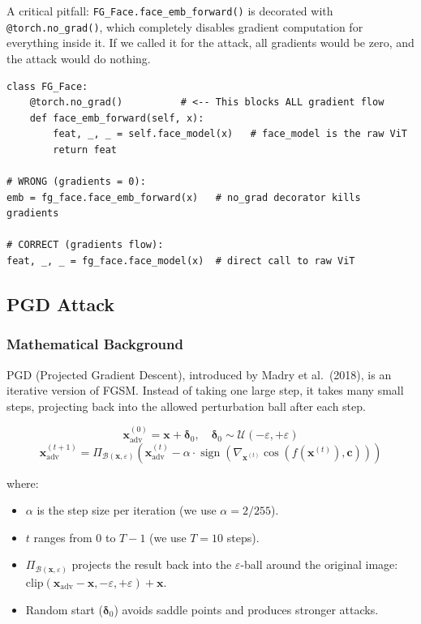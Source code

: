 \documentclass[12pt,a4paper]{article}
\newcommand{\sign}{\operatorname{sign}}
\begin{document}
A critical pitfall: \texttt{FG\_Face.face\_emb\_forward()} is decorated with \texttt{@torch.no\_grad()}, which completely disables gradient computation for everything inside it. If we called it for the attack, all gradients would be zero, and the attack would do nothing.

\begin{lstlisting}[caption={The @no\_grad decorator in FaceModel.py}]
class FG_Face:
    @torch.no_grad()          # <-- This blocks ALL gradient flow
    def face_emb_forward(self, x):
        feat, _, _ = self.face_model(x)   # face_model is the raw ViT
        return feat

# WRONG (gradients = 0):
emb = fg_face.face_emb_forward(x)   # no_grad decorator kills gradients

# CORRECT (gradients flow):
feat, _, _ = fg_face.face_model(x)  # direct call to raw ViT
\end{lstlisting}

\subsection{PGD Attack}

\subsubsection{Mathematical Background}

PGD (Projected Gradient Descent), introduced by Madry et al.\ (2018), is an iterative version of FGSM. Instead of taking one large step, it takes many small steps, projecting back into the allowed perturbation ball after each step.

\begin{equation}
\mathbf{x}^{(0)}_{\text{adv}} = \mathbf{x} + \boldsymbol{\delta}_0, \quad \boldsymbol{\delta}_0 \sim \mathcal{U}(-\varepsilon, +\varepsilon)
\end{equation}
\begin{equation}
\mathbf{x}^{(t+1)}_{\text{adv}} = \Pi_{\mathcal{B}(\mathbf{x},\varepsilon)}\!\left(\mathbf{x}^{(t)}_{\text{adv}} - \alpha \cdot \sign\!\left(\nabla_{\mathbf{x}^{(t)}} \cos\!\left(f(\mathbf{x}^{(t)}), \mathbf{c}\right)\right)\right)
\end{equation}

where:
\begin{itemize}
    \item $\alpha$ is the step size per iteration (we use $\alpha = 2/255$).
    \item $t$ ranges from 0 to $T-1$ (we use $T = 10$ steps).
    \item $\Pi_{\mathcal{B}(\mathbf{x},\varepsilon)}$ projects the result back into the $\varepsilon$-ball around the original image: $\text{clip}(\mathbf{x}_{\text{adv}} - \mathbf{x}, -\varepsilon, +\varepsilon) + \mathbf{x}$.
    \item Random start ($\boldsymbol{\delta}_0$) avoids saddle points and produces stronger attacks.
\end{itemize}
\end{document}
